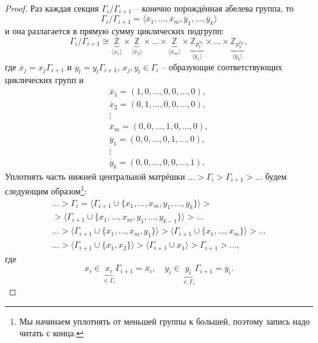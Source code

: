 \documentclass{article}
\begin{document}
\begin{proof}
    Раз каждая секция $\Gamma_i / \Gamma_{i + 1}$ -- конечно порождённая абелева группа, то $$ \Gamma_i / \Gamma_{i + 1} = \langle \overline{x}_1, \ldots, \overline{x}_m, \overline{y}_1, \ldots, \overline{y}_k \rangle $$
    и она разлагается в прямую сумму циклических подгрупп:
    \[
        \Gamma_i / \Gamma_{i + 1} \cong \underbrace{\mathbb{Z}}_{\langle \overline{x}_1 \rangle} \times \underbrace{\mathbb{Z}}_{\langle \overline{x}_2 \rangle} \times \ldots \times \underbrace{\mathbb{Z}}_{\langle \overline{x}_m \rangle} \times \underbrace{\mathbb{Z}_{p_1^{\alpha_1}}}_{\langle \overline{y}_1 \rangle} \times \ldots \times \underbrace{\mathbb{Z}_{p_k^{\alpha_k}}}_{\langle \overline{y}_k \rangle},
    \]
    где $\overline{x}_j = x_j \Gamma_{i+1}$ и $\overline{y}_l = y_l \Gamma_{i + 1}$, $x_j, y_l \in \Gamma_i$ -- образующие соответствующих циклических групп и
    \begin{gather*}
        \overline{x}_1 = (1, 0, \ldots, 0, 0, \ldots, 0), \\
        \overline{x}_2 = (0, 1, \ldots, 0, 0, \ldots, 0), \\
        \vdots \\
        \overline{x}_m = (0, 0, \ldots, 1, 0, \ldots, 0), \\
        \overline{y}_1 = (0, 0, \ldots, 0, 1, \ldots, 0), \\
        \vdots \\
        \overline{y}_k = (0, 0, \ldots, 0, 0, \ldots, 1).
    \end{gather*}
    Уплотнять часть нижней центральной матрёшки $\ldots > \Gamma_i > \Gamma_{i + 1} > \ldots$ будем следующим образом\footnote{Мы начинаем уплотнять от меньшей группы к большей, поэтому запись надо читать с конца.}:
    \begin{gather*}
        \ldots > \Gamma_i = \langle \Gamma_{i + 1} \cup \{ x_1, \ldots, x_m, y_1, \ldots, y_k \} \rangle > \\
        > \langle \Gamma_{i + 1} \cup \{ x_1, \ldots, x_m, y_1, \ldots, y_{k - 1} \} \rangle > \ldots \\
        \ldots > \langle \Gamma_{i + 1} \cup \{ x_1, \ldots, x_m, y_1 \} \rangle > \langle \Gamma_{i + 1} \cup \{ x_1, \ldots, x_m \} \rangle > \ldots \\
        \ldots > \langle \Gamma_{i + 1} \cup \{ x_1, x_2 \} \rangle > \langle \Gamma_{i + 1} \cup x_1 \rangle > \Gamma_{i + 1} > \ldots,
    \end{gather*}
    где $$ x_i \in \underbrace{x_i}_{\in \Gamma_i} \Gamma_{i + 1} = \overline{x}_i, \quad y_i \in \underbrace{y_i}_{\in \Gamma_i} \Gamma_{i + 1} = \overline{y}_i. $$

\end{proof}
\end{document}
